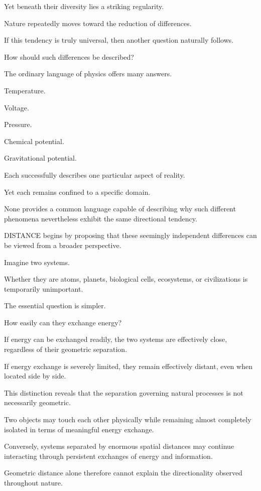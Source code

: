 Yet beneath their diversity lies a striking regularity.

Nature repeatedly moves toward the reduction of differences.

If this tendency is truly universal, then another question naturally follows.

How should such differences be described?

The ordinary language of physics offers many answers.

Temperature.

Voltage.

Pressure.

Chemical potential.

Gravitational potential.

Each successfully describes one particular aspect of reality.

Yet each remains confined to a specific domain.

None provides a common language capable of describing why such different phenomena nevertheless exhibit the same directional tendency.

DISTANCE begins by proposing that these seemingly independent differences can be viewed from a broader perspective.

Imagine two systems.

Whether they are atoms, planets, biological cells, ecosystems, or civilizations is temporarily unimportant.

The essential question is simpler.

How easily can they exchange energy?

If energy can be exchanged readily, the two systems are effectively close, regardless of their geometric separation.

If energy exchange is severely limited, they remain effectively distant, even when located side by side.

This distinction reveals that the separation governing natural processes is not necessarily geometric.

Two objects may touch each other physically while remaining almost completely isolated in terms of meaningful energy exchange.

Conversely, systems separated by enormous spatial distances may continue interacting through persistent exchanges of energy and information.

Geometric distance alone therefore cannot explain the directionality observed throughout nature.

